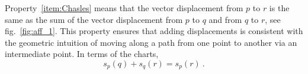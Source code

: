 \documentclass[axioms,article,submit,pdftex,moreauthors]{Definitions/mdpi}
\theoremstyle{plain}
\theoremstyle{remark}
\begin{document}
Property~\ref{item:Chasles} means that the vector displacement from \( p \) to \( r \) is the same as the sum of the vector displacement from \( p \) to \( q \) and from \( q \) to \( r \), see fig.~\ref{fig:aff_1}. This property ensures that adding displacements is consistent with the geometric intuition of moving along a path from one point to another via an intermediate point. In terms of the charts, 
\begin{equation} \label{eq:Chasles}
   s_p(q) + s_q(r) = s_p(r) \ .
   \end{equation}
      \begin{figure}[t]
    \centering
\begin{tikzpicture}[x=0.75pt,y=0.75pt,yscale=-1,xscale=1]


\end{tikzpicture}
\end{figure}
\end{document}
